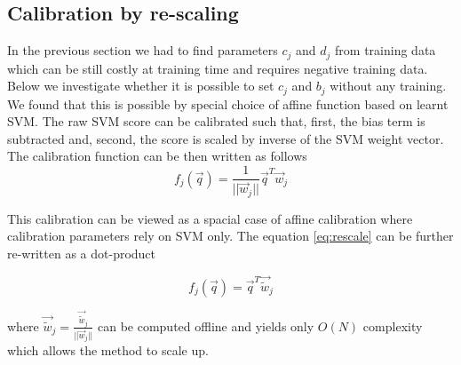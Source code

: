    \subsection{Calibration by re-scaling}

      In the previous section we had to find parameters $c_j$ and $d_j$ from training data which can be still costly at training time and requires negative training data. Below we investigate whether it is possible to set $c_j$ and $b_j$ without any training. We found that this is possible by special choice of affine function based on learnt SVM. 
      The raw SVM score can be calibrated such that, first, the bias term is subtracted and, second, the score is scaled by inverse of the SVM weight vector. The calibration function can be then written as follows
      \begin{equation}
         f_j(\vec{q}) = \dfrac{1}{||\vec{w}_j||}\vec{q}^T\vec{w}_j
         \label{eq:rescale}
      \end{equation}

      \noindent
      This calibration can be viewed as a spacial case of affine calibration where calibration parameters rely on SVM only. The equation \eqref{eq:rescale} can be further re-written as a dot-product
      
      \begin{equation}
         f_j(\vec{q}) = \vec{q}^T\vec{\tilde{w}}_j
         \label{eq:rescaled}
      \end{equation}

      \noindent
      where $\vec{\tilde{w}}_j=\frac{\vec{\tilde{w}}_j}{||\vec{w}_j||}$ can be computed offline and yields only $O(N)$ complexity which allows the method to scale up.
   
